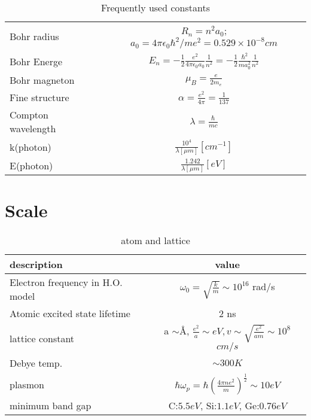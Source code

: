 \begin{table}[h]
    \caption{Frequently used constants}
    \label{tab:constants}
    \begin{center}
	\begin{tabular}{l|c}
	    \hline
	    Bohr radius	    & $R_n = n^2 a_0$;  $a_0 = 4\pi\epsilon_0 \hbar^2/me^2 = 0.529\times 10^{-8} cm$	\\
	    Bohr Energe	    & $\displaystyle E_n = -\frac{1}{2}\frac{e^2}{4\pi\epsilon_0 a_0} \frac{1}{n^2} = -\frac{1}{2}\frac{\hbar^2}{ma_0^2}\frac{1}{n^2}$ \\
	    Bohr magneton   & $\displaystyle \mu_B=\frac{e}{2m_e}$ \\
	    Fine structure  & $\displaystyle \alpha=\frac{e^2}{4\pi}=\frac{1}{137}$	\\
	    Compton wavelength	&   $\displaystyle \lambda = \frac{\hbar}{mc}$  \\
	    k(photon)	    & $\displaystyle \frac{10^4}{\lambda[\mu m]}[cm^{-1}]$	\\
	    E(photon)	    & $\displaystyle \frac{1.242}{\lambda[\mu m]}[eV]$	\\
	    \hline
	\end{tabular}
    \end{center}
\end{table}



\section{Scale}
\begin{table}[h]
    \centering
    \caption{atom and lattice}
    \label{tab:atom}
    \begin{tabular}{l | c}
	\hline
	description & value \\
	\hline
	Electron frequency in H.O. model    & $\omega_0 = \sqrt{\frac{k}{m}} \sim 10^{16}$ rad/s \\
	\hline
	Atomic excited state lifetime  & 2 ns\\
	\hline
	lattice constant & a $\sim\si{\angstrom}$, $\frac{e^2}{a} \sim eV, v \sim \sqrt{\frac{e^2}{am}} \sim 10^{8}$ $cm/s$  \\ 
	\hline
	Debye temp. & $\sim 300 K$  \\
	\hline
	plasmon	& $\hbar \omega_p = \hbar \left(\frac{4\pi ne^2}{m}\right)^{\frac{1}{2}} \sim 10 eV$	\\
	\hline
	minimum band gap    & C:$5.5 eV$, Si:$1.1eV$, Ge:$0.76eV$
    \end{tabular}
\end{table}

